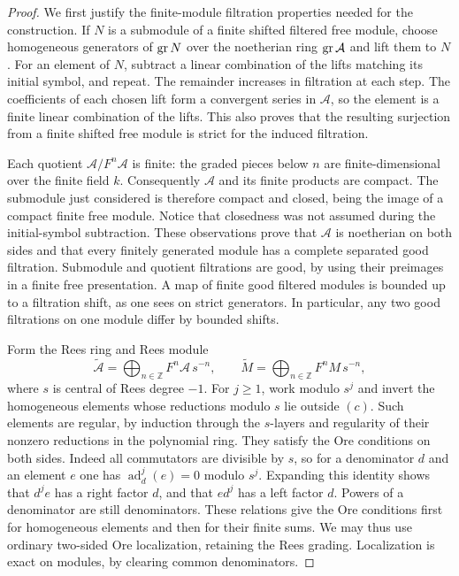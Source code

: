 \begin{proof}
We first justify the finite-module filtration properties needed for the
construction.  If $N$ is a submodule of a finite shifted filtered free
module, choose homogeneous generators of $\operatorname{gr} N$ over the noetherian
ring $\operatorname{gr}\mathcal A$ and lift them to $N$.  For an element of $N$,
subtract a linear combination of the lifts matching its initial symbol,
and repeat.  The remainder increases in filtration at each step.
The coefficients of each chosen lift form a convergent series in
$\mathcal A$, so the element is a finite linear combination of the
lifts.  This also proves that the resulting surjection from a finite
shifted free module is strict for the induced filtration.

Each quotient $\mathcal A/F^n\mathcal A$ is finite: the graded pieces
below $n$ are finite-dimensional over the finite field $k$.
Consequently $\mathcal A$ and its finite products are compact.
The submodule just considered is therefore compact and closed, being
the image of a compact finite free module.  Notice that closedness was
not assumed during the initial-symbol subtraction.  These observations
prove that $\mathcal A$ is noetherian on both sides and that every
finitely generated module has a complete separated good filtration.
Submodule and quotient filtrations are good, by using their preimages
in a finite free presentation.  A map of finite good filtered modules
is bounded up to a filtration shift, as one sees on strict generators.
In particular, any two good filtrations on one module differ by bounded
shifts.

Form the Rees ring and Rees module
\[
 \widetilde{\mathcal A}
   =\bigoplus_{n\in\mathbb Z}F^n\mathcal A\,s^{-n},
 \qquad
 \widetilde M
   =\bigoplus_{n\in\mathbb Z}F^nM\,s^{-n},
\]
where $s$ is central of Rees degree $-1$.
For $j\geq1$, work modulo $s^j$ and invert the homogeneous elements
whose reductions modulo $s$ lie outside $(c)$.
Such elements are regular, by induction through the $s$-layers and
regularity of their nonzero reductions in the polynomial ring.
They satisfy the Ore conditions on both sides.  Indeed all commutators
are divisible by $s$, so for a denominator $d$ and an element $e$ one
has $\operatorname{ad}_d^j(e)=0$ modulo $s^j$.  Expanding this identity
shows that $d^j e$ has a right factor $d$, and that $e d^j$ has a left
factor $d$.  Powers of a denominator are still denominators.  These
relations give the Ore conditions first for homogeneous elements and
then for their finite sums.  We may thus use ordinary two-sided Ore
localization, retaining the Rees grading.  Localization is exact on
modules, by clearing common denominators.


\end{proof}
